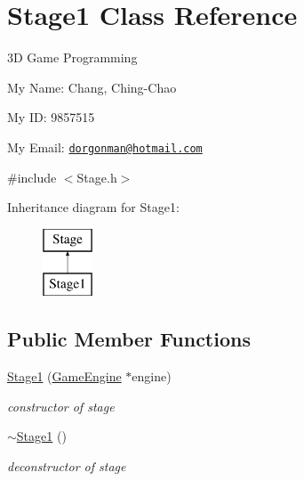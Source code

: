 \hypertarget{class_stage1}{
\section{Stage1 Class Reference}
\label{class_stage1}
}


3D Game Programming\par
 My Name: Chang, Ching-\/Chao\par
 My ID: 9857515\par
 My Email: \href{mailto:dorgonman@hotmail.com}{\tt dorgonman@hotmail.com}  




{\ttfamily \#include $<$Stage.h$>$}

Inheritance diagram for Stage1:\begin{figure}[H]
\begin{center}
\leavevmode
\includegraphics[height=2.000000cm]{class_stage1}
\end{center}
\end{figure}
\subsection*{Public Member Functions}
\begin{DoxyCompactItemize}
\item 
\hypertarget{class_stage1_a17a974df183d322a87adf66db1d36170}{
\hyperlink{class_stage1_a17a974df183d322a87adf66db1d36170}{Stage1} (\hyperlink{class_game_engine}{GameEngine} $\ast$engine)}
\label{class_stage1_a17a974df183d322a87adf66db1d36170}

\begin{DoxyCompactList}\small\item\em constructor of stage \end{DoxyCompactList}\item 
\hypertarget{class_stage1_a0bd922af78678696112fe8d4091cfa4f}{
\hyperlink{class_stage1_a0bd922af78678696112fe8d4091cfa4f}{$\sim$Stage1} ()}
\label{class_stage1_a0bd922af78678696112fe8d4091cfa4f}

\begin{DoxyCompactList}\small\item\em deconstructor of stage \end{DoxyCompactList}\end{DoxyCompactItemize}
